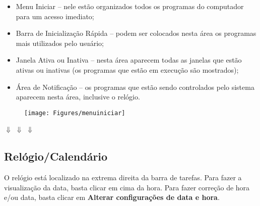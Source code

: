 \documentclass[12pt]{article}
\begin{document}
\begin{itemize}
	\item Menu Iniciar – nele estão organizados todos os programas do computador para um acesso imediato;

	\item Barra de Inicialização Rápida – podem ser colocados nesta área os programas mais utilizados pelo usuário;

	\item Janela Ativa ou Inativa – nesta área aparecem todas as janelas que estão ativas ou inativas (os programas que estão em execução são mostrados);

	\item Área de Notificação – os programas que estão sendo controlados pelo sistema aparecem nesta área, inclusive o relógio.
	
\end{itemize}
	
		\begin{figure}[!hb]
			\texttt{[image: Figures/menuiniciar]}
			\label{fig:menu iniciar}
		
		\end{figure}	
	  {\vspace{-0.8cm}\hspace{-0.6cm}\huge{$\Downarrow$}}     {\vspace{-0.8cm}\hspace{3.6cm}\huge{$\Downarrow$}}
	  {\vspace{-0.8cm}\hspace{7.6cm}\huge{$\Downarrow$}}\\
	  \bigskip
	  
	  \vspace{1cm}
	  \hspace{-0.6cm}{\small Iniciar } \hspace{1cm}{\tiny Barra de Inicialização Rápida e Janelas Ativas e Inativas}
	  \hspace{1.2cm}{\small Área de Notificação}
	  \newpage
  
  \subsection{Relógio/Calendário}
	
	O relógio está localizado na extrema direita da barra de tarefas. Para fazer a visualização da data, basta clicar em cima da hora. Para fazer correção de hora e/ou data, basta clicar em {\bf Alterar configurações de data e hora}. 
	
\end{document}
